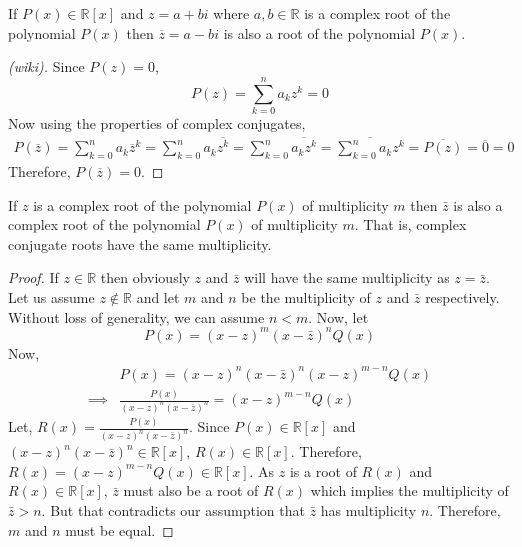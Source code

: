 \documentclass[11pt,numbers=noenddot,svgnames,dvipsnames]{scrartcl}
\begin{document}
\begin{theorem}
    If $P(x) \in \mathbb{R}[x]$ and $z=a+bi$ where $a,b \in \mathbb{R}$ is a complex root of the polynomial 
    $P(x)$ then $\overline{z}=a-bi$ is also a root of the polynomial $P(x)$.
\end{theorem}
\begin{proof}[(wiki)]
    Since $P(z)=0$,
    \begin{equation*}
        P(z) = \sum_{k=0}^{n} a_{k} z^{k} = 0
    \end{equation*}
    Now using the properties of complex conjugates,
    \begin{align*}
        P(\overline{z}) = \sum_{k=0}^{n} a_{k} \overline{z}^{k} 
                        = \sum_{k=0}^{n} a_{k} \overline{z^{k}} 
                        = \sum_{k=0}^{n} \overline{a_{k} z^{k}} 
                        = \overline{\sum_{k=0}^{n} a_{k} z^{k}} 
                        = \overline{P(z)} 
                        = \overline{0} 
                        = 0
    \end{align*}
    Therefore, $P(\overline{z})=0$.
\end{proof}
\begin{corollary}
    If $z$ is a complex root of the polynomial $P(x)$ of multiplicity $m$ then $\bar{z}$ is also 
    a complex root of the polynomial $P(x)$ of multiplicity $m$. That is, complex conjugate roots have 
    the same multiplicity.
\end{corollary}
\begin{proof}
    If $z \in \mathbb{R}$ then obviously $z$ and $\bar{z}$ will have the same multiplicity as $z=\bar{z}$. 
    Let us assume $z \not \in \mathbb{R}$ and let $m$ and $n$ be the multiplicity of $z$ and $\bar{z}$ respectively. 
    Without loss of generality, we can assume $n < m$. Now, let 
    \[
        P(x) = (x-z)^{m}(x-\bar{z})^{n} Q(x)
    \]
    Now,
    \begin{align*}
                 & P(x) = (x-z)^{n}(x-\bar{z})^{n} (x-z)^{m-n} Q(x) \\
        \implies & \frac{P(x)}{(x-z)^{n}(x-\bar{z})^{n}} = (x-z)^{m-n} Q(x)
    \end{align*}
    Let, $R(x) = \frac{P(x)}{(x-z)^{n}(x-\bar{z})^{n}}$. 
    Since $P(x)\in \mathbb{R}[x]$ and $(x-z)^{n}(x-\bar{z})^{n} \in \mathbb{R}[x]$, $R(x) \in \mathbb{R}[x]$. 
    Therefore, $R(x) = (x-z)^{m-n} Q(x) \in \mathbb{R}[x]$. As $z$ is a root of $R(x)$ and $R(x) \in \mathbb{R}[x]$, 
    $\bar{z}$ must also be a root of $R(x)$ which implies the multiplicity of $\bar{z} > n$. But that contradicts our 
    assumption that $\bar{z}$ has multiplicity $n$. Therefore, $m$ and $n$ must be equal.
\end{proof}
\end{document}
